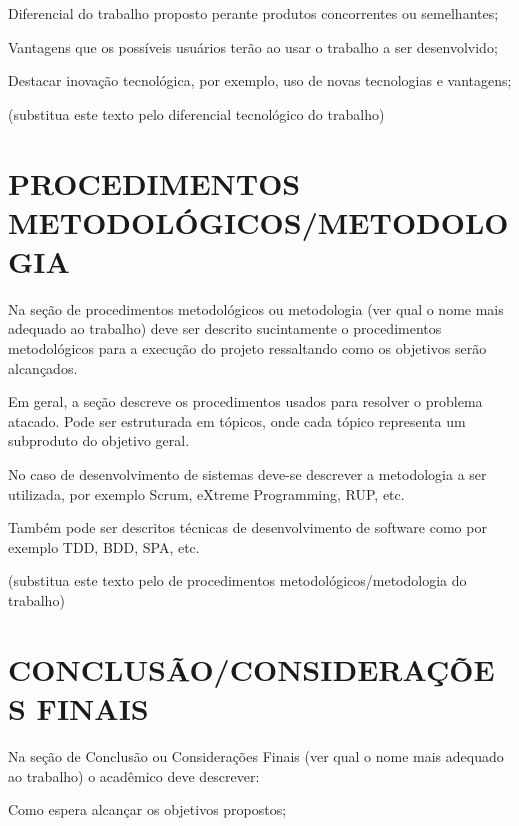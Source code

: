 Diferencial do trabalho proposto perante produtos concorrentes ou semelhantes;

Vantagens que os possíveis usuários terão ao usar o trabalho a ser desenvolvido;

Destacar inovação tecnológica, por exemplo, uso de novas tecnologias e vantagens;

(substitua este texto pelo diferencial tecnológico do trabalho)

\section{PROCEDIMENTOS METODOLÓGICOS/METODOLOGIA} %
\label{sec:metodologia}
Na seção de procedimentos metodológicos ou metodologia (ver qual o nome mais adequado ao trabalho) deve ser descrito sucintamente o procedimentos metodológicos para a execução do projeto ressaltando como os objetivos serão alcançados. 

Em geral, a seção descreve os procedimentos usados para resolver o problema atacado. Pode ser estruturada em tópicos, onde cada tópico representa um subproduto do objetivo geral.

No caso de desenvolvimento de sistemas deve-se descrever a metodologia a ser utilizada, por exemplo Scrum, eXtreme Programming, RUP, etc. 

Também pode ser descritos técnicas de desenvolvimento de software como por exemplo TDD, BDD, SPA,  etc.

(substitua este texto pelo de procedimentos metodológicos/metodologia do trabalho)

\section{CONCLUSÃO/CONSIDERAÇÕES FINAIS} %
\label{sec:conclusao}
Na seção de Conclusão ou Considerações Finais (ver qual o nome mais adequado ao trabalho) o acadêmico deve descrever:

Como espera alcançar os objetivos propostos;

